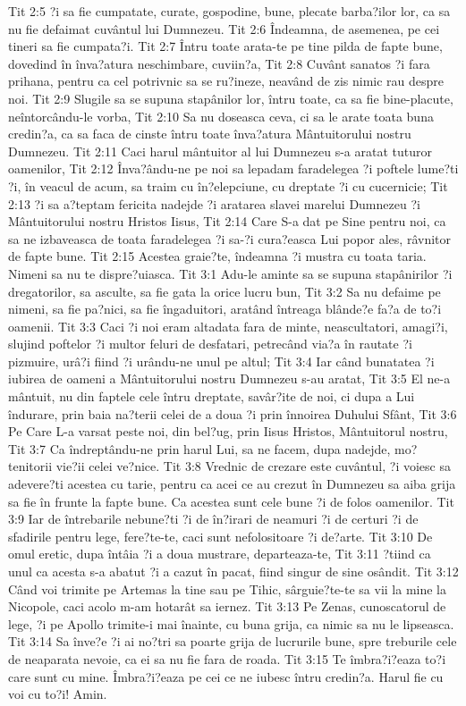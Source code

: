 Tit 2:5  ?i sa fie cumpatate, curate, gospodine, bune, plecate barba?ilor lor, ca sa nu fie defaimat cuvântul lui Dumnezeu.
Tit 2:6  Îndeamna, de asemenea, pe cei tineri sa fie cumpata?i.
Tit 2:7  Întru toate arata-te pe tine pilda de fapte bune, dovedind în înva?atura neschimbare, cuviin?a,
Tit 2:8  Cuvânt sanatos ?i fara prihana, pentru ca cel potrivnic sa se ru?ineze, neavând de zis nimic rau despre noi.
Tit 2:9  Slugile sa se supuna stapânilor lor, întru toate, ca sa fie bine-placute, neîntorcându-le vorba,
Tit 2:10  Sa nu doseasca ceva, ci sa le arate toata buna credin?a, ca sa faca de cinste întru toate înva?atura Mântuitorului nostru Dumnezeu.
Tit 2:11  Caci harul mântuitor al lui Dumnezeu s-a aratat tuturor oamenilor,
Tit 2:12  Înva?ându-ne pe noi sa lepadam faradelegea ?i poftele lume?ti ?i, în veacul de acum, sa traim cu în?elepciune, cu dreptate ?i cu cucernicie;
Tit 2:13  ?i sa a?teptam fericita nadejde ?i aratarea slavei marelui Dumnezeu ?i Mântuitorului nostru Hristos Iisus,
Tit 2:14  Care S-a dat pe Sine pentru noi, ca sa ne izbaveasca de toata faradelegea ?i sa-?i cura?easca Lui popor ales, râvnitor de fapte bune.
Tit 2:15  Acestea graie?te, îndeamna ?i mustra cu toata taria. Nimeni sa nu te dispre?uiasca.
Tit 3:1  Adu-le aminte sa se supuna stapânirilor ?i dregatorilor, sa asculte, sa fie gata la orice lucru bun,
Tit 3:2  Sa nu defaime pe nimeni, sa fie pa?nici, sa fie îngaduitori, aratând întreaga blânde?e fa?a de to?i oamenii.
Tit 3:3  Caci ?i noi eram altadata fara de minte, neascultatori, amagi?i, slujind poftelor ?i multor feluri de desfatari, petrecând via?a în rautate ?i pizmuire, urâ?i fiind ?i urându-ne unul pe altul;
Tit 3:4  Iar când bunatatea ?i iubirea de oameni a Mântuitorului nostru Dumnezeu s-au aratat,
Tit 3:5  El ne-a mântuit, nu din faptele cele întru dreptate, savâr?ite de noi, ci dupa a Lui îndurare, prin baia na?terii celei de a doua ?i prin înnoirea Duhului Sfânt,
Tit 3:6  Pe Care L-a varsat peste noi, din bel?ug, prin Iisus Hristos, Mântuitorul nostru,
Tit 3:7  Ca îndreptându-ne prin harul Lui, sa ne facem, dupa nadejde, mo?tenitorii vie?ii celei ve?nice.
Tit 3:8  Vrednic de crezare este cuvântul, ?i voiesc sa adevere?ti acestea cu tarie, pentru ca acei ce au crezut în Dumnezeu sa aiba grija sa fie în frunte la fapte bune. Ca acestea sunt cele bune ?i de folos oamenilor.
Tit 3:9  Iar de întrebarile nebune?ti ?i de în?irari de neamuri ?i de certuri ?i de sfadirile pentru lege, fere?te-te, caci sunt nefolositoare ?i de?arte.
Tit 3:10  De omul eretic, dupa întâia ?i a doua mustrare, departeaza-te,
Tit 3:11  ?tiind ca unul ca acesta s-a abatut ?i a cazut în pacat, fiind singur de sine osândit.
Tit 3:12  Când voi trimite pe Artemas la tine sau pe Tihic, sârguie?te-te sa vii la mine la Nicopole, caci acolo m-am hotarât sa iernez.
Tit 3:13  Pe Zenas, cunoscatorul de lege, ?i pe Apollo trimite-i mai înainte, cu buna grija, ca nimic sa nu le lipseasca.
Tit 3:14  Sa înve?e ?i ai no?tri sa poarte grija de lucrurile bune, spre treburile cele de neaparata nevoie, ca ei sa nu fie fara de roada.
Tit 3:15  Te îmbra?i?eaza to?i care sunt cu mine. Îmbra?i?eaza pe cei ce ne iubesc întru credin?a. Harul fie cu voi cu to?i! Amin.


